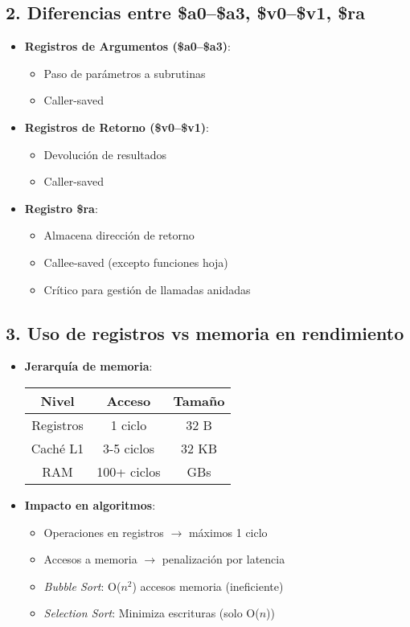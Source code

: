 \documentclass{article}
\begin{document}
\subsection*{2. Diferencias entre \$a0–\$a3, \$v0–\$v1, \$ra}
\begin{itemize}
  \item \textbf{Registros de Argumentos (\$a0–\$a3)}:
  \begin{itemize}
    \item Paso de parámetros a subrutinas
    \item Caller-saved
  \end{itemize}
  
  \item \textbf{Registros de Retorno (\$v0–\$v1)}:
  \begin{itemize}
    \item Devolución de resultados
    \item Caller-saved
  \end{itemize}
  
  \item \textbf{Registro \$ra}:
  \begin{itemize}
    \item Almacena dirección de retorno
    \item Callee-saved (excepto funciones hoja)
    \item Crítico para gestión de llamadas anidadas
  \end{itemize}
\end{itemize}

\subsection*{3. Uso de registros vs memoria en rendimiento}
\begin{itemize}
  \item \textbf{Jerarquía de memoria}:
  \begin{center}
    \begin{tabular}{c|c|c}
      \textbf{Nivel} & \textbf{Acceso} & \textbf{Tamaño} \\
      \hline
      Registros & 1 ciclo & 32 B \\
      Caché L1 & 3-5 ciclos & 32 KB \\
      RAM & 100+ ciclos & GBs \\
    \end{tabular}
  \end{center}
  
  \item \textbf{Impacto en algoritmos}:
  \begin{itemize}
    \item Operaciones en registros $\rightarrow$ máximos 1 ciclo
    \item Accesos a memoria $\rightarrow$ penalización por latencia
    \item \textit{Bubble Sort}: O($n^2$) accesos memoria (ineficiente)
    \item \textit{Selection Sort}: Minimiza escrituras (solo O($n$))
  \end{itemize}
\end{itemize}
\end{document}
